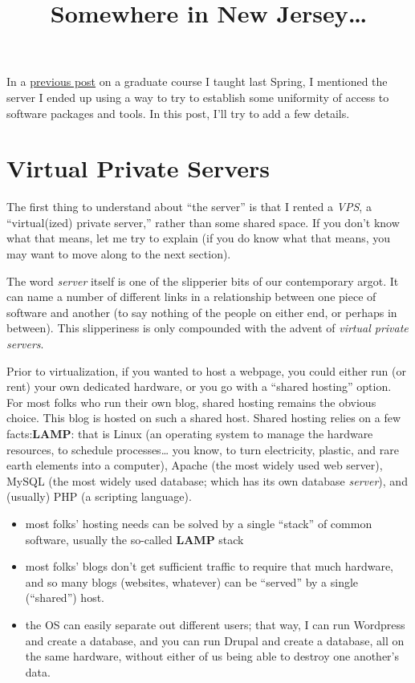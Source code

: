 \documentclass[
  12pt,
]{article}
\title{Somewhere in New Jersey\ldots{}}
\author{}
\date{}
\providecommand{\tightlist}{%
  \setlength{\itemsep}{0pt}\setlength{\parskip}{0pt}}
\begin{document}
In a \href{/2013/08/teaching-dh}{previous post} on a graduate course I
taught last Spring, I mentioned the server I ended up using a way to try
to establish some uniformity of access to software packages and tools.
In this post, I'll try to add a few details.

\hypertarget{virtual-private-servers}{%
\section{Virtual Private Servers}\label{virtual-private-servers}}

The first thing to understand about ``the server'' is that I rented a
\emph{VPS}, a ``virtual(ized) private server,'' rather than some shared
space. If you don't know what that means, let me try to explain (if you
do know what that means, you may want to move along to the next
section).

The word \emph{server} itself is one of the slipperier bits of our
contemporary argot. It can name a number of different links in a
relationship between one piece of software and another (to say nothing
of the people on either end, or perhaps in between). This slipperiness
is only compounded with the advent of \emph{virtual private servers}.

Prior to virtualization, if you wanted to host a webpage, you could
either run (or rent) your own dedicated hardware, or you go with a
``shared hosting'' option. For most folks who run their own blog, shared
hosting remains the obvious choice. This blog is hosted on such a shared
host. Shared hosting relies on a few facts:{\textbf{LAMP}: that is Linux
(an operating system to manage the hardware resources, to schedule
processes\ldots{} you know, to turn electricity, plastic, and rare earth
elements into a computer), Apache (the most widely used web server),
MySQL (the most widely used database; which has its own database
\emph{server}), and (usually) PHP (a scripting language).}

\begin{itemize}
\tightlist
\item
  most folks' hosting needs can be solved by a single ``stack'' of
  common software, usually the so-called \textbf{LAMP} stack
\item
  most folks' blogs don't get sufficient traffic to require that much
  hardware, and so many blogs (websites, whatever) can be ``served'' by
  a single (``shared'') host.
\item
  the OS can easily separate out different users; that way, I can run
  Wordpress and create a database, and you can run Drupal and create a
  database, all on the same hardware, without either of us being able to
  destroy one another's data.
\end{itemize}
\end{document}

